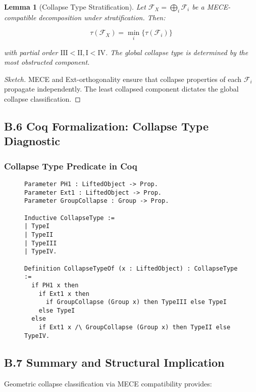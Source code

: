 \documentclass[11pt]{article}
\newtheorem{lemma}[theorem]{Lemma}
\begin{document}
\begin{lemma}[Collapse Type Stratification]
Let \( \mathcal{F}_X = \bigoplus_i \mathcal{F}_i \) be a MECE-compatible decomposition under stratification. Then:

\[
\tau(\mathcal{F}_X) = \min_i \{ \tau(\mathcal{F}_i) \}
\]

with partial order \( \mathrm{III} < \mathrm{II}, \mathrm{I} < \mathrm{IV} \). The global collapse type is determined by the most obstructed component.

\end{lemma}

\begin{proof}[Sketch]
MECE and Ext-orthogonality ensure that collapse properties of each \( \mathcal{F}_i \) propagate independently. The least collapsed component dictates the global collapse classification.
\end{proof}

\subsection*{B.6 Coq Formalization: Collapse Type Diagnostic}

\subsubsection*{Collapse Type Predicate in Coq}

\begin{figure}[h]
\centering
\begin{lstlisting}[language=Coq, caption=Collapse Type Assignment]
Parameter PH1 : LiftedObject -> Prop.
Parameter Ext1 : LiftedObject -> Prop.
Parameter GroupCollapse : Group -> Prop.

Inductive CollapseType :=
| TypeI
| TypeII
| TypeIII
| TypeIV.

Definition CollapseTypeOf (x : LiftedObject) : CollapseType :=
  if PH1 x then
    if Ext1 x then
      if GroupCollapse (Group x) then TypeIII else TypeI
    else TypeI
  else
    if Ext1 x /\ GroupCollapse (Group x) then TypeII else TypeIV.
\end{lstlisting}
\end{figure}

\subsection*{B.7 Summary and Structural Implication}

Geometric collapse classification via MECE compatibility provides:
\end{document}
